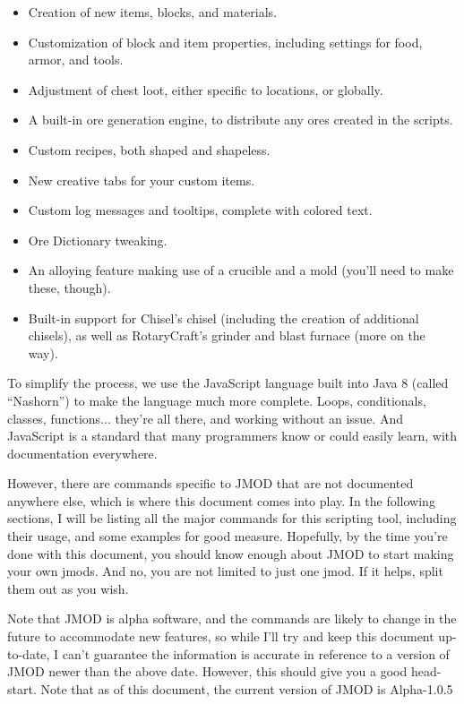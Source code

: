 \documentclass[letterpaper,titlepage,12pt]{article}
\begin{document}
\begin{itemize}
\item Creation of new items, blocks, and materials.
\item Customization of block and item properties, including settings for food, armor, and tools.
\item Adjustment of chest loot, either specific to locations, or globally.
\item A built-in ore generation engine, to distribute any ores created in the scripts.
\item Custom recipes, both shaped and shapeless.
\item New creative tabs for your custom items.
\item Custom log messages and tooltips, complete with colored text.
\item Ore Dictionary tweaking.
\item An alloying feature making use of a crucible and a mold (you'll need to make these, though).
\item Built-in support for Chisel's chisel (including the creation of additional chisels), as well as RotaryCraft's grinder and blast furnace (more on the way).
\end{itemize}

To simplify the process, we use the JavaScript language built into Java 8 (called ``Nashorn'') to make the language much more complete.  Loops, conditionals, classes, functions... they're all there, and working without an issue.  And JavaScript is a standard that many programmers know or could easily learn, with documentation everywhere.

However, there are commands specific to JMOD that are not documented anywhere else, which is where this document comes into play.  In the following sections, I will be listing all the major commands for this scripting tool, including their usage, and some examples for good measure.  Hopefully, by the time you're done with this document, you should know enough about JMOD to start making your own jmods.  And no, you are not limited to just one jmod.  If it helps, split them out as you wish.

Note that JMOD is alpha software, and the commands are likely to change in the future to accommodate new features, so while I'll try and keep this document up-to-date, I can't guarantee the information is accurate in reference to a version of JMOD newer than the above date.  However, this should give you a good head-start.  Note that as of this document, the current version of JMOD is Alpha-1.0.5
\end{document}
